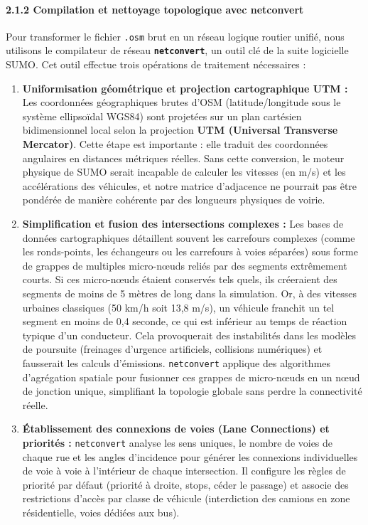\documentclass[10pt, a4paper]{article}
\begin{document}
\paragraph{2.1.2 Compilation et nettoyage topologique avec
netconvert}\label{compilation-et-nettoyage-topologique-avec-netconvert}

Pour transformer le fichier \texttt{.osm} brut en un réseau logique
routier unifié, nous utilisons le compilateur de réseau
\textbf{\texttt{netconvert}}, un outil clé de la suite logicielle SUMO.
Cet outil effectue trois opérations de traitement nécessaires :

\begin{enumerate}
\def\labelenumi{\arabic{enumi}.}
\item
  \textbf{Uniformisation géométrique et projection cartographique UTM :}
  Les coordonnées géographiques brutes d'OSM (latitude/longitude sous le
  système ellipsoïdal WGS84) sont projetées sur un plan cartésien
  bidimensionnel local selon la projection \textbf{UTM (Universal
  Transverse Mercator)}. Cette étape est importante : elle traduit des
  coordonnées angulaires en distances métriques réelles. Sans cette
  conversion, le moteur physique de SUMO serait incapable de calculer
  les vitesses (en m/s) et les accélérations des véhicules, et notre
  matrice d'adjacence ne pourrait pas être pondérée de manière cohérente
  par des longueurs physiques de voirie.
\item
  \textbf{Simplification et fusion des intersections complexes :} Les
  bases de données cartographiques détaillent souvent les carrefours
  complexes (comme les ronds-points, les échangeurs ou les carrefours à
  voies séparées) sous forme de grappes de multiples micro-nœuds reliés
  par des segments extrêmement courts. Si ces micro-nœuds étaient
  conservés tels quels, ils créeraient des segments de moins de 5 mètres
  de long dans la simulation. Or, à des vitesses urbaines classiques (50
  km/h soit 13,8 m/s), un véhicule franchit un tel segment en moins de
  0,4 seconde, ce qui est inférieur au temps de réaction typique d'un
  conducteur. Cela provoquerait des instabilités dans les modèles de
  poursuite (freinages d'urgence artificiels, collisions numériques) et
  fausserait les calculs d'émissions. \texttt{netconvert} applique des
  algorithmes d'agrégation spatiale pour fusionner ces grappes de
  micro-nœuds en un nœud de jonction unique, simplifiant la topologie
  globale sans perdre la connectivité réelle.
\item
  \textbf{Établissement des connexions de voies (Lane Connections) et
  priorités :} \texttt{netconvert} analyse les sens uniques, le nombre
  de voies de chaque rue et les angles d'incidence pour générer les
  connexions individuelles de voie à voie à l'intérieur de chaque
  intersection. Il configure les règles de priorité par défaut (priorité
  à droite, stops, céder le passage) et associe des restrictions d'accès
  par classe de véhicule (interdiction des camions en zone
  résidentielle, voies dédiées aux bus).
\end{enumerate}
\end{document}
